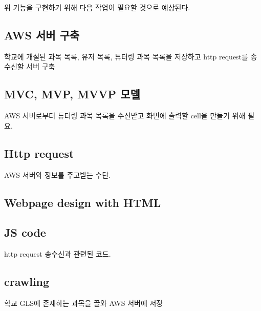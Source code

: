 \documentclass{lxaiproposal}
\begin{document}
위 기능을 구현하기 위해 다음 작업이 필요할 것으로 예상된다.
\subsection{AWS 서버 구축}
학교에 개설된 과목 목록, 유저 목록, 튜터링 과목 목록을 저장하고 http request를 송수신할 서버 구축

\subsection{MVC, MVP, MVVP 모델}
AWS 서버로부터 튜터링 과목 목록을 수신받고 화면에 출력할 cell을 만들기 위해 필요.

\subsection{Http request}
AWS 서버와 정보를 주고받는 수단.

\subsection{Webpage design with HTML}


\subsection{JS code}
http request 송수신과 관련된 코드.

\subsection{crawling}
학교 GLS에 존재하는 과목을 끌와 AWS 서버에 저장

% 
% 

\end{document}
